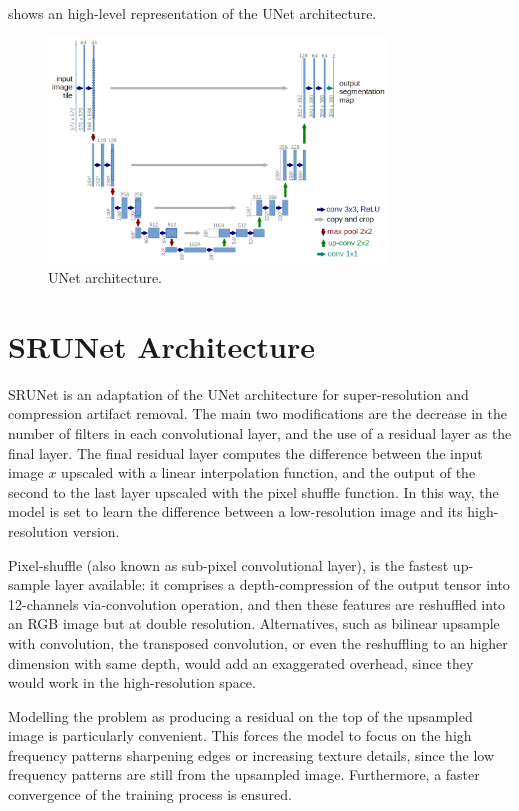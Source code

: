  shows an high-level representation of the UNet architecture.

\begin{figure}[h]
\centering
\includegraphics[width=0.8\textwidth]{static/unet_architecture.png}
\caption{UNet architecture.}
\label{fig:unet}
\end{figure}

\section{SRUNet Architecture}

SRUNet is an adaptation of the UNet architecture for super-resolution and compression artifact removal. The main two modifications are the decrease in the number of filters in each convolutional layer, and the use of a residual layer as the final layer.
The final residual layer computes the difference between the input image $x$ upscaled with a linear interpolation function, and the output of the second to the last layer upscaled with the pixel shuffle function. In this way, the model is set to learn the difference between a low-resolution image and its high-resolution version.

Pixel-shuffle (also known as sub-pixel convolutional layer), is the fastest up-sample layer available: it comprises a depth-compression of the output tensor into 12-channels via-convolution operation, and then these features are reshuffled into an RGB image but at double resolution. Alternatives, such as bilinear upsample with convolution, the transposed convolution, or even the reshuffling to an higher dimension with same depth, would add an exaggerated overhead, since they would work in the high-resolution space.

Modelling the problem as producing a residual on the top of the upsampled image is particularly convenient. This forces the model to focus on the high frequency patterns sharpening edges or increasing texture details, since the low frequency patterns are still from the upsampled image. Furthermore, a faster convergence of the training process is ensured.
 
